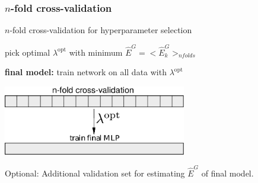 \subsubsection{$n$-fold cross-validation}

\begin{frame}
	\begin{block}{$n$-fold cross-validation for hyperparameter selection}
		\vspace{2mm}

		pick optimal $\lambda^{\text{opt}}$ with minimum $\widehat{E}^G=\big<\widehat{E}^G_{k}\big>_{n folds}$\\
		\vspace{2mm}

		\textbf{final model:} train network on all data with $\lambda^{\text{opt}}$ 
	\end{block}
	
	\vspace{2mm}
	\begin{center}
		\includegraphics[width=8cm]{img/nfoldcrossvalidation.pdf} 
	\end{center}
	Optional: Additional validation set for estimating $\widehat{E}^G$ of final model.
\end{frame}

